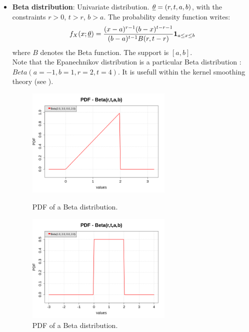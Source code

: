 {\begin{itemize}
\item {\bf Beta distribution}: Univariate distribution. ${\underline{\theta}} = \left( r,t,a,b \right)$, with the constraints $r>0$, $t>r$, $b>a$. The probability density function writes:
\begin{equation}
f_X(x;{\underline{\theta}}) = \frac{(x-a)^{r-1} (b-x)^{t-r-1}}{(b-a)^{t-1} B(r,t-r)} \mathbf{1}_{a \leq x \leq b}
\end{equation}
where $B$ denotes the Beta function. The support is $[a,b]$.\\
Note that the Epanechnikov distribution is a particular Beta distribution : $Beta (a=-1, b=1, r=2, t=4)$. It is usefull within the kernel smoothing theory (see ).


\begin{figure}[H]
\begin{minipage}{8cm}
\begin{center}
\includegraphics[width=7cm]{Figures/pdf_Beta_1.png}
\caption{PDF of a Beta distribution.}
\end{center}
\end{minipage}
\hfill
\begin{minipage}{8cm}
\begin{center}
\includegraphics[width=7cm]{Figures/pdf_Beta_2.png}
\caption{PDF of a Beta distribution.}
\end{center}
\end{minipage}
\end{figure}


\end{itemize}}

